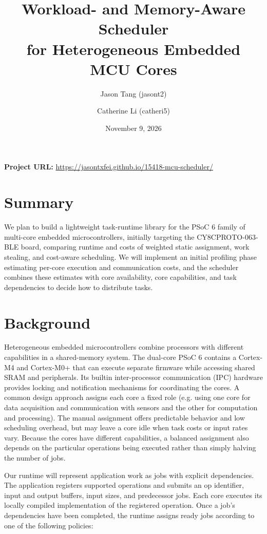 \documentclass[11pt]{article}
\title{Workload- and Memory-Aware Scheduler\\
for Heterogeneous Embedded MCU Cores}
\author{Jason Tang (jasont2) \and Catherine Li (catheri5)}
\date{November 9, 2026}
\begin{document}
\maketitle

\noindent\textbf{Project URL:} \href{https://jasontxfei.github.io/15418-mcu-scheduler/}{https://jasontxfei.github.io/15418-mcu-scheduler/}

\section{Summary}
We plan to build a lightweight task-runtime library for the PSoC 6 family
of multi-core embedded microcontrollers, initially targeting the
CY8CPROTO-063-BLE board, comparing runtime and costs of weighted static
assignment, work stealing, and cost-aware scheduling. We will implement an initial profiling phase estimating per-core execution and communication costs, and the scheduler combines these estimates with core availability, core capabilities, and task dependencies to decide how to distribute tasks.

\section{Background}
Heterogeneous embedded microcontrollers combine processors with different capabilities in a shared-memory system. The dual-core PSoC 6 contains a Cortex-M4 and Cortex-M0+ that can execute separate firmware while accessing shared SRAM and peripherals. Its builtin inter-processor communication (IPC) hardware provides locking and notification mechanisms for coordinating the cores. A common design approach assigns each core a fixed role (e.g. using one core for data acquisition and communication with sensors and the other for computation and processing). The manual assignment offers predictable behavior and low scheduling overhead, but may leave a core idle when task costs or input rates vary. Because the cores have different capabilities, a balanced assignment also depends on the particular operations being executed rather than simply halving the number of jobs. 

Our runtime will represent application work as jobs with explicit dependencies. The application registers supported operations and submits an op identifier, input and output buffers, input sizes, and predecessor jobs. Each core executes its locally compiled implementation of the registered operation. Once a job's dependencies have been completed, the runtime assigns ready jobs according to one of the following policies:
\end{document}
